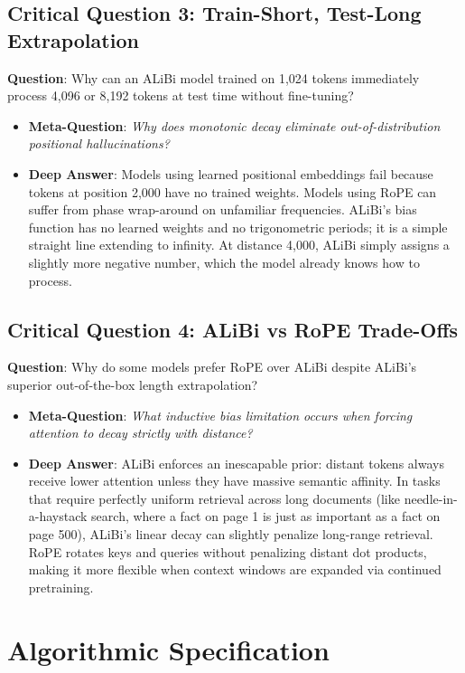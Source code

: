 \documentclass[11pt,a4paper]{article}
\theoremstyle{definition}
\begin{document}
\subsection{\textbf{Critical Question 3: Train-Short, Test-Long Extrapolation}}
\textbf{Question}: Why can an ALiBi model trained on 1,024 tokens immediately process 4,096 or 8,192 tokens at test time without fine-tuning?
\begin{itemize}
    \item \textbf{Meta-Question}: \emph{Why does monotonic decay eliminate out-of-distribution positional hallucinations?}
    \item \textbf{Deep Answer}: Models using learned positional embeddings fail because tokens at position 2,000 have no trained weights. Models using RoPE can suffer from phase wrap-around on unfamiliar frequencies. ALiBi's bias function has no learned weights and no trigonometric periods; it is a simple straight line extending to infinity. At distance 4,000, ALiBi simply assigns a slightly more negative number, which the model already knows how to process.
\end{itemize}

\subsection{\textbf{Critical Question 4: ALiBi vs RoPE Trade-Offs}}
\textbf{Question}: Why do some models prefer RoPE over ALiBi despite ALiBi's superior out-of-the-box length extrapolation?
\begin{itemize}
    \item \textbf{Meta-Question}: \emph{What inductive bias limitation occurs when forcing attention to decay strictly with distance?}
    \item \textbf{Deep Answer}: ALiBi enforces an inescapable prior: distant tokens always receive lower attention unless they have massive semantic affinity. In tasks that require perfectly uniform retrieval across long documents (like needle-in-a-haystack search, where a fact on page 1 is just as important as a fact on page 500), ALiBi's linear decay can slightly penalize long-range retrieval. RoPE rotates keys and queries without penalizing distant dot products, making it more flexible when context windows are expanded via continued pretraining.
\end{itemize}

\section{Algorithmic Specification}
\end{document}
